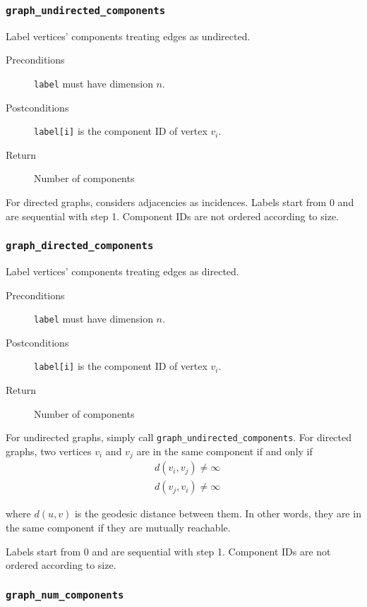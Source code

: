 \documentclass[a4paper,10pt]{article}
\begin{document}
\subsubsection{\texttt{graph\_undirected\_components}}

Label vertices' components treating edges as undirected.

\begin{description}
 \item[Preconditions] \texttt{label} must have dimension $n$.
 \item[Postconditions] \texttt{label[i]} is the component ID of vertex $v_i$.
 \item[Return] Number of components
\end{description}

For directed graphs, considers adjacencies as incidences.
Labels start from 0 and are sequential with step 1.
Component IDs are not ordered according to size.

\subsubsection{\texttt{graph\_directed\_components}}

Label vertices' components treating edges as directed.

\begin{description}
 \item[Preconditions] \texttt{label} must have dimension $n$.
 \item[Postconditions] \texttt{label[i]} is the component ID of vertex $v_i$.
 \item[Return] Number of components
\end{description}

For undirected graphs, simply call \texttt{graph\_undirected\_components}. For 
directed graphs, two vertices $v_i$ and $v_j$ are in the same component if and
only if
\begin{align*}
 &d(v_i, v_j) \neq \infty \\
 &d(v_j, v_i) \neq \infty
\end{align*}

where $d(u,v)$ is the geodesic distance between them. In other words, they are
in the same component if they are mutually reachable.

Labels start from 0 and are sequential with step 1.
Component IDs are not ordered according to size.

\subsubsection{\texttt{graph\_num\_components}}
\end{document}
